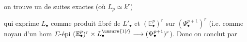 on trouve un  de suites exactes (où $L_p\simeq k^r$)


qui exprime $L_{\bullet}$ comme produit fibré de $L'_{\bullet}$ et $(\mathbb E_{\bullet}^{p})^r$ sur $(\Psi_{\bullet}^{p+1})^r$ (i.e. comme noyau d'un hom  $\Sigma$-\uline{épi} $(\mathbb E_{\bullet}^{p})^{r}\times L_{\bullet}^{\unsure{1|\prime}}\longrightarrow(\Psi_{\bullet}^{p+1})^{r}$). Donc on conclut par

